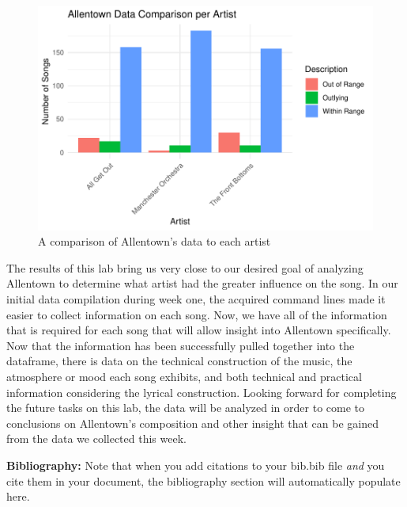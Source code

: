 \documentclass{article}\usepackage[]{graphicx}\usepackage[]{xcolor}
\begin{document}
\begin{multicols}{2}
\begin{figure}[H]
 \begin{center}
 \includegraphics[scale=0.65]{descript_plot.pdf}
 \caption{A comparison of Allentown's data to each artist}
 \label{plot3}
 \end{center}
 \end{figure}





The results of this lab bring us very close to our desired goal of analyzing Allentown to determine what artist had the greater influence on the song. In our initial data compilation during week one, the acquired command lines made it easier to collect information on each song. Now, we have all of the information that is required for each song that will allow insight into Allentown specifically. Now that the information has been successfully pulled together into the dataframe, there is data on the technical construction of the music, the atmosphere or mood each song exhibits, and both technical and practical information considering the lyrical construction. Looking forward for completing the future tasks on this lab, the data will be analyzed in order to come to conclusions on Allentown's composition and other insight that can be gained from the data we collected this week.








\vspace{2em}

\noindent\textbf{Bibliography:} Note that when you add citations to your bib.bib file \emph{and}
you cite them in your document, the bibliography section will automatically populate here.

\begin{tiny}

\end{tiny}
\end{multicols}

\end{document}
